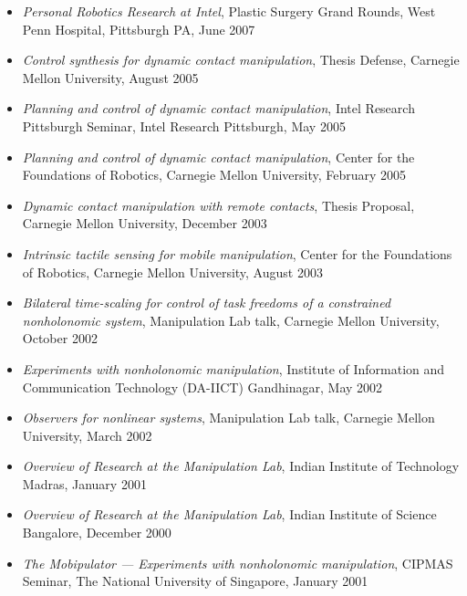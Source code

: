 \begin{itemize}
\item \textit{Personal Robotics Research at Intel},
Plastic Surgery Grand Rounds, West Penn Hospital, Pittsburgh PA, June 2007
\item \textit{Control synthesis for dynamic contact manipulation},
Thesis Defense,  Carnegie Mellon University, August 2005
\item \textit{Planning and control of dynamic contact manipulation},
Intel Research Pittsburgh Seminar, Intel Research Pittsburgh, May 2005
\item \textit{Planning and control of dynamic contact manipulation},
Center for the Foundations of Robotics,  Carnegie Mellon University, February 2005
\item \textit{Dynamic contact manipulation with remote contacts},
Thesis Proposal,  Carnegie Mellon University, December 2003
\item \textit{Intrinsic tactile sensing for mobile manipulation},
Center for the Foundations of Robotics,  Carnegie Mellon University, August 2003
\item \textit{Bilateral time-scaling for control of task freedoms of a constrained nonholonomic system},
Manipulation Lab talk, Carnegie Mellon University, October 2002
\item \textit{Experiments with nonholonomic manipulation},
Institute of Information and Communication Technology (DA-IICT) Gandhinagar, May 2002
\item \textit{Observers for nonlinear systems},
Manipulation Lab talk, Carnegie Mellon University, March 2002
\item \textit{Overview of Research at the Manipulation Lab},
Indian Institute of Technology Madras, January 2001
\item \textit{Overview of Research at the Manipulation Lab},
Indian Institute of Science Bangalore, December 2000
\item \textit{The Mobipulator ---  Experiments with nonholonomic manipulation},
CIPMAS Seminar, The National University of Singapore, January 2001

\end{itemize}



